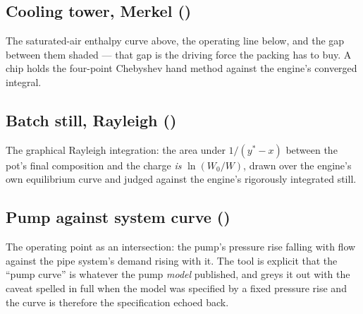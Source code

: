 \documentclass[11pt,a4paper]{article}
\begin{document}
\subsection*{Cooling tower, Merkel \quad()}
The saturated-air enthalpy curve above, the operating line below, and the
gap between them shaded --- that gap is the driving force the packing has
to buy.  A chip holds the four-point Chebyshev hand method against the
engine's converged integral.

\subsection*{Batch still, Rayleigh \quad()}
The graphical Rayleigh integration: the area under $1/(y^{*} - x)$ between
the pot's final composition and the charge \emph{is} $\ln(W_0/W)$, drawn
over the engine's own equilibrium curve and judged against the engine's
rigorously integrated still.

\subsection*{Pump against system curve \quad()}
The operating point as an intersection: the pump's pressure rise falling
with flow against the pipe system's demand rising with it.  The tool is
explicit that the ``pump curve'' is whatever the pump \emph{model}
published, and greys it out with the caveat spelled in full when the model
was specified by a fixed pressure rise and the curve is therefore the
specification echoed back.
\end{document}
